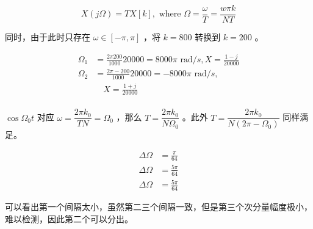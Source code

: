 \documentclass[lang=cn,11pt,a4paper,cite=authoryear, twocolumn]{elegantpaper}
\begin{document}
\[X(j \Omega) = T X[k], \text{ where } \Omega = \frac{\omega}{T} = \frac{w\pi k }{N T} \]  

同时，由于此时只存在 \(\omega \in [-\pi, \pi]\) ，将 \(k = 800\) 转换到 \(k = 200\) 。

\[\begin{aligned}
    \Omega_1 &= \frac{2\pi 200}{1000} 20000 = 8000 \pi \text{ rad}/s , X = \frac{1-j}{20000}\\ 
    \Omega_2 &= \frac{2\pi -200}{1000} 20000 = -8000 \pi \text{ rad}/s, \\
    & \quad X = \frac{1+j}{20000}\\  
\end{aligned}\]


\(\cos \Omega_0 t\) 对应 \(\omega = \dfrac{2\pi k_0}{T N} = \Omega_0\) ，那么 \(T = \dfrac{2\pi k_0}{N\Omega_0}\) 。此外 \(T = \dfrac{2\pi k_0}{N(2\pi - \Omega_0)}\) 同样满足。


\[\begin{aligned}
    \Delta \Omega &= \frac{\pi}{64} \\
    \Delta \Omega &= \frac{5 \pi}{64} \\
    \Delta \Omega &= \frac{5 \pi}{64} 
\end{aligned}\]

可以看出第一个间隔太小，虽然第二三个间隔一致，但是第三个次分量幅度极小，难以检测，因此第二个可以分出。




\end{document}
